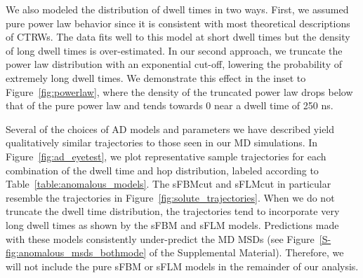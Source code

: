 \documentclass[aps,pre,preprint,groupedaddress,longbibliography]{revtex4-2}
\begin{document}
  We also modeled the distribution of dwell times in two ways. First, we
  assumed pure power law behavior since it is consistent with most theoretical
  descriptions of CTRWs. The data fits well to this model at short dwell times
  but the density of long dwell times is over-estimated. In our second
  approach, we truncate the power law distribution with an exponential cut-off,
  lowering the probability of extremely long dwell times. We demonstrate this
  effect in the inset to Figure~\ref{fig:powerlaw}, where the density of the
  truncated power law drops below that of the pure power law and tends towards
  0 near a dwell time of 250 ns.
  
  Several of the choices of AD models and parameters we have described yield
  qualitatively similar trajectories to those seen in our MD simulations.  In
  Figure~\ref{fig:ad_eyetest}, we plot representative sample trajectories for
  each combination of the dwell time and hop distribution, labeled according to
  Table~\ref{table:anomalous_models}. The sFBMcut and sFLMcut in particular
  resemble the trajectories in Figure~\ref{fig:solute_trajectories}.  When we
  do not truncate the dwell time distribution, the trajectories tend to
  incorporate very long dwell times as shown by the sFBM and sFLM models.
  Predictions made with these models consistently under-predict the MD MSDs
  (see Figure~\ref{S-fig:anomalous_msds_bothmode} of the Supplemental
  Material). Therefore, we will not include the pure sFBM or sFLM models in the
  remainder of our analysis.   
  
\end{document}
